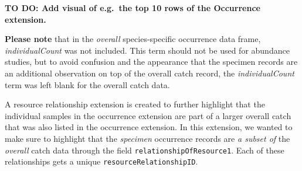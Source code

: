 \documentclass[
]{book}
\newenvironment{Shaded}{\begin{snugshade}}{\end{snugshade}}
\newcommand{\AttributeTok}[1]{\textcolor[rgb]{0.77,0.63,0.00}{#1}}
\newcommand{\CommentTok}[1]{\textcolor[rgb]{0.56,0.35,0.01}{\textit{#1}}}
\newcommand{\ConstantTok}[1]{\textcolor[rgb]{0.00,0.00,0.00}{#1}}
\newcommand{\FunctionTok}[1]{\textcolor[rgb]{0.00,0.00,0.00}{#1}}
\newcommand{\NormalTok}[1]{#1}
\newcommand{\OtherTok}[1]{\textcolor[rgb]{0.56,0.35,0.01}{#1}}
\newcommand{\SpecialCharTok}[1]{\textcolor[rgb]{0.00,0.00,0.00}{#1}}
\newcommand{\StringTok}[1]{\textcolor[rgb]{0.31,0.60,0.02}{#1}}
\begin{document}
\begin{Shaded}
\end{Shaded}

\textbf{TO DO: Add visual of e.g.~the top 10 rows of the Occurrence extension.}

\textbf{Please note} that in the \emph{overall} species-specific occurrence data frame, \emph{individualCount} was not included. This term should not be used for abundance studies, but to avoid confusion and the appearance that the specimen records are an additional observation on top of the overall catch record, the \emph{individualCount} term was left blank for the overall catch data.

A resource relationship extension is created to further highlight that the individual samples in the occurrence extension are part of a larger overall catch that was also listed in the occurrence extension. In this extension, we wanted to make sure to highlight that the \emph{specimen} occurrence records are \emph{a subset of} the \emph{overall} catch data through the field \texttt{relationshipOfResource1}. Each of these relationships gets a unique \texttt{resourceRelationshipID}.
\end{document}
